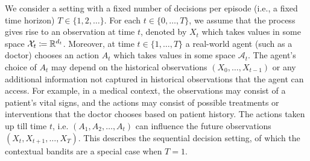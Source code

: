We consider a setting with a fixed number of decisions per episode (i.e., a fixed time horizon) $T \in \{1, 2, \ldots\}$. For each $t\in \{0, \ldots, T\}$, we assume that the process gives rise to an observation at time $t$, denoted by $X_t$ which takes values in some space $\mathcal{X}_t \coloneqq \mathbb{R}^{d_t}$. 
Moreover, at time $t\in  \{1, \ldots, T\}$ a real-world agent (such as a doctor) chooses an action $A_t$ which takes values in some space $\mathcal{A}_t$. The agent's choice of $A_t$ may depend on the historical observations $(X_0, \ldots, X_{t-1})$ or any additional information not captured in historical observations that the agent can access. For example, in a medical context, the observations may consist of a patient's vital signs, and the actions may consist of possible treatments or interventions that the doctor chooses based on patient history.
The actions taken up till time $t$, i.e. $(A_1, A_2, \ldots, A_t)$ can influence the future observations $(X_t, X_{t+1}, \ldots, X_T)$. 
This describes the sequential decision setting, of which the contextual bandits are a special case when $T=1$. 

